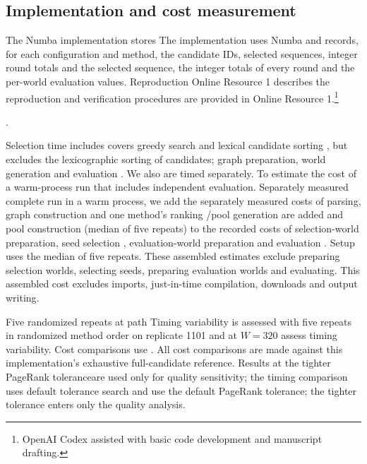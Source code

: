 \documentclass[smallextended]{svjour3}
\providecommand{\DIFaddtex}[1]{{\protect\color{blue} \sf #1}} %
\providecommand{\DIFdeltex}[1]{{\protect\color{red} \scriptsize #1}} %
\providecommand{\DIFaddbegin}{} %
\providecommand{\DIFaddend}{} %
\providecommand{\DIFdelbegin}{} %
\providecommand{\DIFdelend}{} %
\providecommand{\DIFadd}[1]{\texorpdfstring{\DIFaddtex{#1}}{#1}} %
\providecommand{\DIFdel}[1]{\texorpdfstring{\DIFdeltex{#1}}{}} %
\providecommand{\DIFscaledelfig}{0.5}
\newlength{\DIFdelgraphicswidth} %
\newlength{\DIFdelgraphicsheight} %
\providecommand{\DIFaddincludegraphics}[2][]{{\color{blue}\fbox{\DIFOincludegraphics[#1]{#2}}}} %
\providecommand{\DIFdelincludegraphics}[2][]{%
\sbox{\DIFdelgraphicsbox}{\DIFOincludegraphics[#1]{#2}}%
\settoboxwidth{\DIFdelgraphicswidth}{\DIFdelgraphicsbox} %
\settoboxtotalheight{\DIFdelgraphicsheight}{\DIFdelgraphicsbox} %
\scalebox{\DIFscaledelfig}{%
\parbox[b]{\DIFdelgraphicswidth}{\usebox{\DIFdelgraphicsbox}\\[-\baselineskip] \rule{\DIFdelgraphicswidth}{0em}}\llap{\resizebox{\DIFdelgraphicswidth}{\DIFdelgraphicsheight}{%
\setlength{\unitlength}{\DIFdelgraphicswidth}%
\begin{picture}(1,1)%
\thicklines\linethickness{2pt} %
{\color[rgb]{1,0,0}\put(0,0){\framebox(1,1){}}}%
{\color[rgb]{1,0,0}\put(0,0){\line( 1,1){1}}}%
{\color[rgb]{1,0,0}\put(0,1){\line(1,-1){1}}}%
\end{picture}%
}\hspace*{3pt}}} %
} %
\DeclareRobustCommand{\DIFaddbegin}{\DIFOaddbegin \let\includegraphics\DIFaddincludegraphics} %
\DeclareRobustCommand{\DIFaddend}{\DIFOaddend \let\includegraphics\DIFOincludegraphics} %
\DeclareRobustCommand{\DIFdelbegin}{\DIFOdelbegin \let\includegraphics\DIFdelincludegraphics} %
\DeclareRobustCommand{\DIFdelend}{\DIFOaddend \let\includegraphics\DIFOincludegraphics} %
\begin{document}
\subsection{Implementation and cost measurement}\DIFdelbegin \DIFdel{The Numba implementation stores }\DIFdelend \DIFaddbegin \label{sec:cost}
\DIFadd{The implementation uses Numba and records, for each configuration and method, the }\DIFaddend candidate IDs, \DIFdelbegin \DIFdel{selected sequences, integer round totals and }\DIFdelend \DIFaddbegin \DIFadd{the selected sequence, the integer totals of every round and the }\DIFaddend per-world evaluation values. \DIFdelbegin \DIFdel{Reproduction }\DIFdelend \DIFaddbegin \DIFadd{Online Resource 1 describes the reproduction }\DIFaddend and verification procedures\DIFdelbegin \DIFdel{are provided in Online Resource 1.}\footnote{\DIFdel{OpenAI Codex assisted with basic code development and manuscript drafting.}}
\addtocounter{footnote}{-1}%
\DIFdelend \DIFaddbegin \DIFadd{.
}\DIFaddend 

Selection time \DIFdelbegin \DIFdel{includes }\DIFdelend \DIFaddbegin \DIFadd{covers }\DIFaddend greedy search and \DIFdelbegin \DIFdel{lexical candidate sorting , but excludes }\DIFdelend \DIFaddbegin \DIFadd{the lexicographic sorting of candidates; }\DIFaddend graph preparation, world generation and evaluation \DIFdelbegin \DIFdel{. We also }\DIFdelend \DIFaddbegin \DIFadd{are timed separately. To }\DIFaddend estimate the cost of a \DIFdelbegin \DIFdel{warm-process run that includes independent evaluation. Separately measured }\DIFdelend \DIFaddbegin \DIFadd{complete run in a warm process, we add the separately measured costs of }\DIFaddend parsing, graph construction and one method's ranking \DIFdelbegin \DIFdel{/pool generation are added }\DIFdelend \DIFaddbegin \DIFadd{and pool construction (median of five repeats) }\DIFaddend to the recorded costs of \DIFdelbegin \DIFdel{selection-world preparation, seed selection , evaluation-world preparation and evaluation . Setup uses the median of five repeats. These assembled estimates exclude }\DIFdelend \DIFaddbegin \DIFadd{preparing selection worlds, selecting seeds, preparing evaluation worlds and evaluating. This assembled cost excludes }\DIFaddend imports, just-in-time compilation, downloads and output writing.

\DIFdelbegin \DIFdel{Five randomized repeats at path }\DIFdelend \DIFaddbegin \DIFadd{Timing variability is assessed with five repeats in randomized method order on replicate }\DIFaddend 1101 \DIFdelbegin \DIFdel{and }\DIFdelend \DIFaddbegin \DIFadd{at }\DIFaddend $W=320$\DIFdelbegin \DIFdel{assess timing variability. Cost comparisons use }\DIFdelend \DIFaddbegin \DIFadd{. All cost comparisons are made against }\DIFaddend this implementation's exhaustive full-candidate \DIFdelbegin \DIFdel{reference. Results at the tighter PageRank toleranceare used only for quality sensitivity; the timing comparison uses default tolerance }\DIFdelend \DIFaddbegin \DIFadd{search and use the default PageRank tolerance; the tighter tolerance enters only the quality analysis}\DIFaddend .
\end{document}
